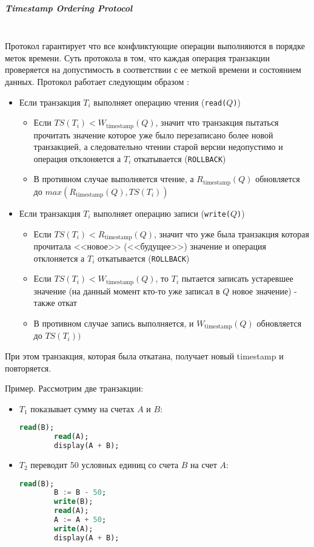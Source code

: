 \subparagraph{Timestamp Ordering Protocol} ~\\

Протокол гарантирует что все конфликтующие операции выполняются в порядке меток времени. Суть протокола в том, что каждая операция транзакции проверяется на допустимость в соответствии с ее меткой времени и состоянием данных. Протокол работает следующим образом \autocite{Silberschatz}:

\begin{itemize}
    \item Если транзакция $T_i$ выполняет операцию чтения (\texttt{read($Q$)})
    \begin{itemize}
        \item Если $TS(T_i) < W_{\text{timestamp}}(Q)$, значит что транзакция пытаться прочитать значение которое уже было перезаписано более новой транзакцией, а следовательно чтении старой версии недопустимо и операция отклоняется а $T_i$ откатывается (\texttt{ROLLBACK})
        \item В противном случае выполняется чтение, а $R_{\text{timestamp}}(Q)$ обновляется до $max(R_{\text{timestamp}}(Q), TS(T_i))$
    \end{itemize}

    \item Если транзакция $T_i$ выполняет операцию записи (\texttt{write($Q$)})
    \begin{itemize}
        \item Если $TS(T_i) < R_{\text{timestamp}}(Q)$, значит что уже была транзакция которая прочитала <<новое>> (<<будущее>>) значение и операция отклоняется а $T_i$ откатывается (\texttt{ROLLBACK})
        \item Если $TS(T_i) < W_{\text{timestamp}}(Q)$, то $T_i$ пытается записать устаревшее значение (на данный момент кто-то уже записал в $Q$ новое значение) - также откат
        \item В противном случае запись выполняется, и $W_{\text{timestamp}}(Q)$ обновляется до $TS(T_i))$ 
    \end{itemize}
\end{itemize}

При этом транзакция, которая была откатана, получает новый timestamp и повторяется.

Пример. Рассмотрим две транзакции:
\begin{itemize}
    \item $T_1$ показывает сумму на счетах $A$ и $B$:
    \begin{lstlisting}[language=SQL]
        read(B);
        read(A);
        display(A + B);           
    \end{lstlisting}

    \item $T_2$ переводит 50 условных единиц со счета $B$ на счет $A$:
    \begin{lstlisting}[language=SQL]
        read(B);
        B := B - 50;
        write(B);
        read(A);
        A := A + 50;
        write(A);
        display(A + B);               
    \end{lstlisting}
\end{itemize}

